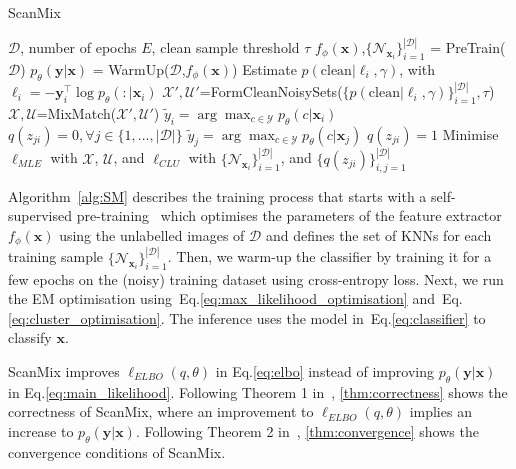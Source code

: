 \documentclass[review]{elsarticle}
\theoremstyle{plain}
\begin{document}
\begin{algorithm}
\scriptsize
\caption{ScanMix}\label{alg:SM}
\begin{algorithmic}
\Require $\mathcal{D}$, number of epochs $E$, clean sample threshold $\tau$
\State $f_{\phi}(\mathbf{x})$,$\{ \mathcal{N}_{\mathbf{x}_{i}} \}_{i=1}^{|\mathcal{D}|}$ = PreTrain($\mathcal{D}$) 
\State $p_{\theta}(\mathbf{y}|\mathbf{x})$ = WarmUp($\mathcal{D}$,$f_{\phi}(\mathbf{x})$) 
 \State Estimate $p(\text{clean}|\ell_i,\gamma)$, with 
 \State $\ell_i=-\mathbf{y}_i^{\top}\log p_{\theta}(:|\mathbf{x}_i)$
 \EndFor
 \State $\mathcal{X}',\mathcal{U}'$=FormCleanNoisySets($\{p(\text{clean}|\ell_i,\gamma)\}_{i=1}^{|\mathcal{D}|},\tau$) 
 \State $\mathcal{X},\mathcal{U}$=MixMatch($\mathcal{X}',\mathcal{U}'$) 
 \State $\tilde{y}_i= \arg\max_{c\in\mathcal{Y}} p_{\theta}(c|\mathbf{x}_i)$
 \State $q(z_{ji}) = 0, \forall j\in\{1,...,|\mathcal{D}|\}$ 
 \State $\tilde{y}_j=\arg\max_{c\in\mathcal{Y}}p_{\theta}(c|\mathbf{x}_j)$
 \State $q(z_{ji}) =1$
 \EndIf
 \EndFor
 \EndFor
  \State Minimise $\ell_{MLE}$ with 
 $\mathcal{X}$, $\mathcal{U}$, and  
 \State $\ell_{CLU}$ with $\{\mathcal{N}_{\mathbf{x}_i}\}_{i=1}^{|\mathcal{D}|}$, and $\{q(z_{ji}) \}_{i,j=1}^{|\mathcal{D}|}$
 \EndWhile
\end{algorithmic}
\end{algorithm}



Algorithm~\ref{alg:SM} describes the training process
that starts with a self-supervised pre-training~\citep{SimCLR,MoCo,MoCoV2,SCAN} which optimises the parameters of the feature extractor $f_{\phi}(\mathbf{x})$ using the unlabelled images of $\mathcal{D}$ and defines the set of KNNs for each training sample $\{ \mathcal{N}_{\mathbf{x}_i} \}_{i=1}^{|\mathcal{D}|}$.
Then, we warm-up the classifier by training it for a few epochs on the (noisy) training dataset using cross-entropy loss. 
Next, we run the EM optimisation using~Eq.\ref{eq:max_likelihood_optimisation}
and~Eq.\ref{eq:cluster_optimisation}.
The inference uses the model in~Eq.\ref{eq:classifier} to classify $\mathbf{x}$.

ScanMix improves $\ell_{ELBO}(q,\theta)$ in Eq.\ref{eq:elbo} instead of improving $p_{\theta}(\mathbf{y}|\mathbf{x})$ in Eq.\ref{eq:main_likelihood}.  Following Theorem 1 in~\citep{dempster1977maximum}, \autoref{thm:correctness} shows the correctness of ScanMix, where an improvement to $\ell_{ELBO}(q,\theta)$ implies an increase to $p_{\theta}(\mathbf{y}|\mathbf{x})$.
Following Theorem 2 in~\citep{dempster1977maximum}, \autoref{thm:convergence} shows the convergence conditions of ScanMix. 
\end{document}
